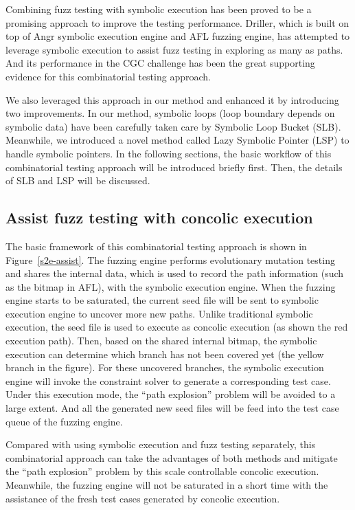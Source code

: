 Combining fuzz testing with symbolic execution has been proved to be a promising approach to improve the testing performance. Driller, which is built on top of Angr symbolic execution engine and AFL fuzzing engine, has attempted to leverage symbolic execution to assist fuzz testing in exploring as many as paths. And its performance in the CGC challenge has been the great supporting evidence for this combinatorial testing approach. 

We also leveraged this approach in our method and enhanced it by introducing two improvements. In our method, symbolic loops (loop boundary depends on symbolic data) have been carefully taken care by Symbolic Loop Bucket (SLB). Meanwhile, we introduced a novel method called Lazy Symbolic Pointer (LSP) to handle symbolic pointers. In the following sections, the basic workflow of this combinatorial testing approach will be introduced briefly first. Then, the details of SLB and LSP will be discussed.

\subsection{Assist fuzz testing with concolic execution}
The basic framework of this combinatorial testing approach is shown in Figure~\ref{s2e-assist}. The fuzzing engine performs evolutionary mutation testing and shares the internal data, which is used to record the path information (such as the bitmap in AFL), with the symbolic execution engine. When the fuzzing engine starts to be saturated, the current seed file will be sent to symbolic execution engine to uncover more new paths. Unlike traditional symbolic execution, the seed file is used to execute as concolic execution (as shown the red execution path). Then, based on the shared internal bitmap, the symbolic execution can determine which branch has not been covered yet (the yellow branch in the figure). For these uncovered branches, the symbolic execution engine will invoke the constraint solver to generate a corresponding test case. Under this execution mode, the ``path explosion'' problem will be avoided to a large extent. And all the generated new seed files will be feed into the test case queue of the fuzzing engine.

Compared with using symbolic execution and fuzz testing separately, this combinatorial approach can take the advantages of both methods and mitigate the ``path explosion'' problem by this scale controllable concolic execution. Meanwhile, the fuzzing engine will not be saturated in a short time with the assistance of the fresh test cases generated by concolic execution.

